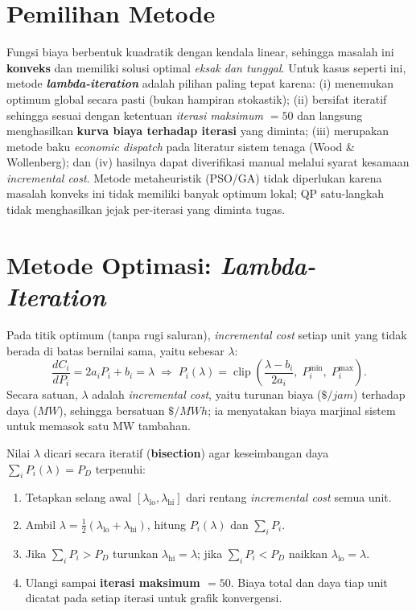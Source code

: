 \documentclass[11pt,a4paper]{article}
\begin{document}
\section{Pemilihan Metode}
Fungsi biaya berbentuk kuadratik dengan kendala linear, sehingga masalah ini
\textbf{konveks} dan memiliki solusi optimal \emph{eksak dan tunggal}. Untuk kasus
seperti ini, metode \textbf{\emph{lambda-iteration}} adalah pilihan paling tepat
karena: (i) menemukan optimum global secara pasti (bukan hampiran stokastik);
(ii) bersifat iteratif sehingga sesuai dengan ketentuan \emph{iterasi maksimum $=50$}
dan langsung menghasilkan \textbf{kurva biaya terhadap iterasi} yang diminta;
(iii) merupakan metode baku \emph{economic dispatch} pada literatur sistem tenaga
(Wood \& Wollenberg); dan (iv) hasilnya dapat diverifikasi manual melalui syarat
kesamaan \emph{incremental cost}. Metode metaheuristik (PSO/GA) tidak diperlukan
karena masalah konveks ini tidak memiliki banyak optimum lokal; QP satu-langkah
tidak menghasilkan jejak per-iterasi yang diminta tugas.

\section{Metode Optimasi: \emph{Lambda-Iteration}}
Pada titik optimum (tanpa rugi saluran), \emph{incremental cost} setiap unit yang
tidak berada di batas bernilai sama, yaitu sebesar $\lambda$:
\begin{equation}
\frac{dC_i}{dP_i} = 2a_i P_i + b_i = \lambda
\;\Longrightarrow\;
P_i(\lambda) = \operatorname{clip}\!\left(\frac{\lambda - b_i}{2a_i},\; P_i^{\min},\; P_i^{\max}\right).
\end{equation}
Secara satuan, $\lambda$ adalah \emph{incremental cost}, yaitu turunan biaya ($\si{\$/jam}$)
terhadap daya ($\si{MW}$), sehingga bersatuan $\si{\$/MWh}$; ia menyatakan biaya marjinal
sistem untuk memasok satu MW tambahan.

Nilai $\lambda$ dicari secara iteratif (\textbf{bisection}) agar keseimbangan daya
$\sum_i P_i(\lambda) = P_D$ terpenuhi:
\begin{enumerate}
  \item Tetapkan selang awal $[\lambda_{\text{lo}}, \lambda_{\text{hi}}]$ dari rentang
  \emph{incremental cost} semua unit.
  \item Ambil $\lambda = \tfrac{1}{2}(\lambda_{\text{lo}}+\lambda_{\text{hi}})$,
  hitung $P_i(\lambda)$ dan $\sum_i P_i$.
  \item Jika $\sum_i P_i > P_D$ turunkan $\lambda_{\text{hi}}\!=\!\lambda$; jika
  $\sum_i P_i < P_D$ naikkan $\lambda_{\text{lo}}\!=\!\lambda$.
  \item Ulangi sampai \textbf{iterasi maksimum $=50$}. Biaya total dan daya tiap unit
  dicatat pada setiap iterasi untuk grafik konvergensi.
\end{enumerate}
\end{document}
